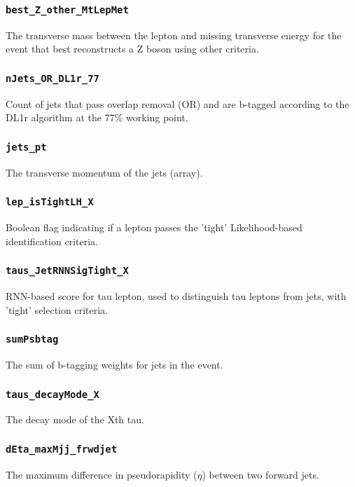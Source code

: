 \subsubsection{\texttt{best\_Z\_other\_MtLepMet}} The transverse mass between the lepton and missing transverse energy for
the event that best reconstructs a Z boson using other criteria.

\subsubsection{\texttt{nJets\_OR\_DL1r\_77}} Count of jets that pass overlap removal (OR) and are b-tagged according to the
DL1r algorithm at the 77\% working point.

\subsubsection{\texttt{jets\_pt}} The transverse momentum of the jets (array).

\subsubsection{\texttt{lep\_isTightLH\_X}} Boolean flag indicating if a lepton passes the 'tight' Likelihood-based
identification criteria.

\subsubsection{\texttt{taus\_JetRNNSigTight\_X}} RNN-based score for tau lepton, used to distinguish tau leptons from
jets, with 'tight' selection criteria.

\subsubsection{\texttt{sumPsbtag}} The sum of b-tagging weights for jets in the event.

\subsubsection{\texttt{taus\_decayMode\_X}} The decay mode of the Xth tau.

\subsubsection{\texttt{dEta\_maxMjj\_frwdjet}} The maximum difference in pseudorapidity ($\eta$) between two forward jets.

